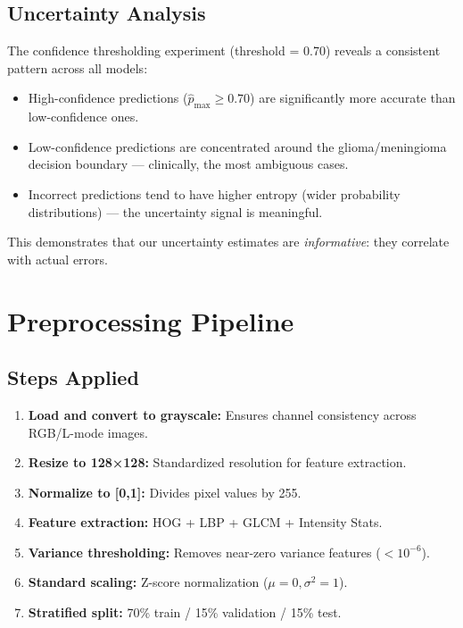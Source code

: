 \documentclass[12pt,a4paper]{article}
\begin{document}
\subsection{Uncertainty Analysis}

The confidence thresholding experiment (threshold = 0.70) reveals a consistent pattern across all models:
\begin{itemize}[noitemsep]
    \item High-confidence predictions ($\hat{p}_{\max} \geq 0.70$) are significantly more accurate than low-confidence ones.
    \item Low-confidence predictions are concentrated around the glioma/meningioma decision boundary — clinically, the most ambiguous cases.
    \item Incorrect predictions tend to have higher entropy (wider probability distributions) — the uncertainty signal is meaningful.
\end{itemize}

This demonstrates that our uncertainty estimates are \textit{informative}: they correlate with actual errors.

\section{Preprocessing Pipeline}

\subsection{Steps Applied}

\begin{enumerate}[noitemsep]
    \item \textbf{Load and convert to grayscale:} Ensures channel consistency across RGB/L-mode images.
    \item \textbf{Resize to 128×128:} Standardized resolution for feature extraction.
    \item \textbf{Normalize to [0,1]:} Divides pixel values by 255.
    \item \textbf{Feature extraction:} HOG + LBP + GLCM + Intensity Stats.
    \item \textbf{Variance thresholding:} Removes near-zero variance features ($< 10^{-6}$).
    \item \textbf{Standard scaling:} Z-score normalization ($\mu=0, \sigma^2=1$).
    \item \textbf{Stratified split:} 70\% train / 15\% validation / 15\% test.
\end{enumerate}
\end{document}
